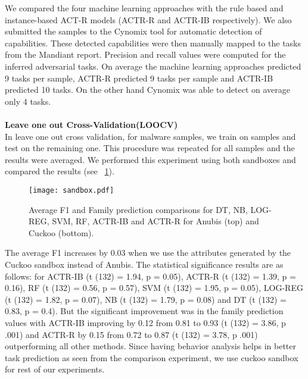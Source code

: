 \documentclass[conference]{IEEEtran}
\begin{document}
We compared the four machine learning approaches with the rule based and instance-based ACT-R models (ACTR-R and ACTR-IB respectively). We also submitted the samples to the Cynomix tool for automatic detection of capabilities. These detected capabilities were then manually mapped to the tasks from the Mandiant report. Precision and recall values were computed for the inferred adversarial tasks. On average the machine learning approaches predicted 9 tasks per sample, ACTR-R predicted 9 tasks per sample and ACTR-IB predicted 10 tasks. On the other hand Cynomix was able to detect on average only 4 tasks.\\\\
{\bf Leave one out Cross-Validation(LOOCV)}\\
In leave one out cross validation, for  malware samples, we train on  samples and test on the remaining one. This procedure was repeated for all samples and the results were averaged. We performed this experiment using both sandboxes and compared the results (see \figurename~\ref{fig:one}).

\begin{figure}[htp!]
	\centerline{\texttt{[image: sandbox.pdf]}}
	\vspace{0em}
	\caption{\textmd{Average F1 and Family prediction comparisons for DT, NB, LOG-REG, SVM, RF, ACTR-IB and ACTR-R for Anubis (top) and Cuckoo (bottom).}}
	\vspace{-1em}
	\label{fig:one}
\end{figure}

The average F1 increases by 0.03 when we use the attributes generated by the Cuckoo sandbox instead of Anubis. The statistical significance results are as follows: for ACTR-IB  (t (132) = 1.94, p = 0.05), ACTR-R (t (132) = 1.39, p = 0.16), RF (t (132) = 0.56, p = 0.57), SVM (t (132) = 1.95, p = 0.05), LOG-REG (t (132) = 1.82, p = 0.07), NB (t (132) = 1.79, p = 0.08) and DT (t (132) = 0.83, p = 0.4). But the significant improvement was in the family prediction values with ACTR-IB improving by 0.12 from 0.81 to 0.93 (t (132) = 3.86, p  .001) and ACTR-R by 0.15 from 0.72 to 0.87 (t (132) = 3.78, p  .001) outperforming all other methods. Since having behavior analysis helps in better task prediction as seen from the comparison experiment, we use cuckoo sandbox for rest of our experiments.
\end{document}
